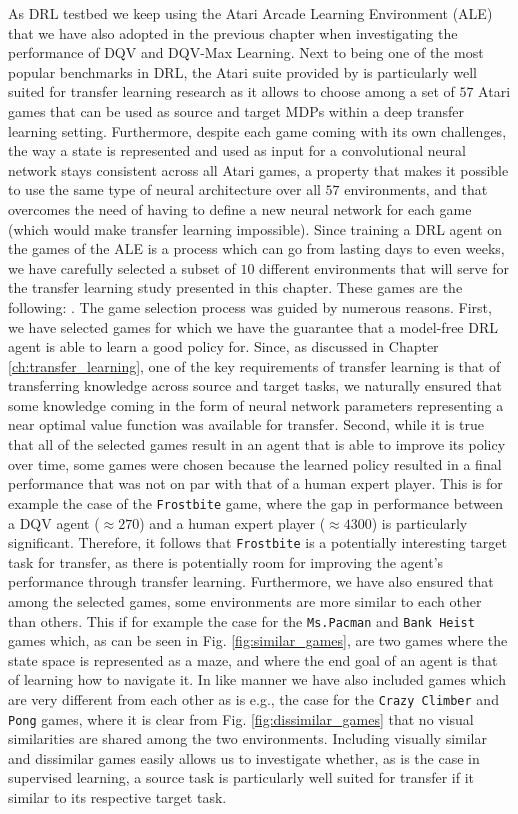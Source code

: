As DRL testbed we keep using the Atari Arcade Learning Environment (ALE) that we have also adopted in the previous chapter when investigating the performance of DQV and DQV-Max Learning. Next to being one of the most popular benchmarks in DRL, the Atari suite provided by \citet{bellemare2013arcade} is particularly well suited for transfer learning research as it allows to choose among a set of $57$ Atari games that can be used as source and target MDPs within a deep transfer learning setting. Furthermore, despite each game coming with its own challenges, the way a state is represented and used as input for a convolutional neural network stays consistent across all Atari games, a property that makes it possible to use the same type of neural architecture over all $57$ environments, and that overcomes the need of having to define a new neural network for each game (which would make transfer learning impossible). Since training a DRL agent on the games of the ALE is a process which can go from lasting days to even weeks, we have carefully selected a subset of $10$ different environments that will serve for the transfer learning study presented in this chapter. These games are the following: . The game selection process was guided by numerous reasons. First, we have selected games for which we have the guarantee that a model-free DRL agent is able to learn a good policy for. Since, as discussed in Chapter \ref{ch:transfer_learning}, one of the key requirements of transfer learning is that of transferring knowledge across source and target tasks, we naturally ensured that some knowledge coming in the form of neural network parameters representing a near optimal value function was available for transfer. Second, while it is true that all of the selected games result in an agent that is able to improve its policy over time, some games were chosen because the learned policy resulted in a final performance that was not on par with that of a human expert player. This is for example the case of the \texttt{Frostbite} game, where the gap in performance between a DQV agent ($\approx 270$) and a human expert player ($\approx 4300$) is particularly significant. Therefore, it follows that \texttt{Frostbite} is a potentially interesting target task for transfer, as there is potentially room for improving the agent's performance through transfer learning. Furthermore, we have also ensured that among the selected games, some environments are more similar to each other than others. This if for example the case for the \texttt{Ms.Pacman} and \texttt{Bank Heist} games which, as can be seen in Fig. \ref{fig:similar_games}, are two games where the state space is represented as a maze, and where the end goal of an agent is that of learning how to navigate it. In like manner we have also included games which are very different from each other as is e.g., the case for the \texttt{Crazy Climber} and \texttt{Pong} games, where it is clear from Fig. \ref{fig:dissimilar_games} that no visual similarities are shared among the two environments. Including visually similar and dissimilar games easily allows us to investigate whether, as is the case in supervised learning, a source task is particularly well suited for transfer if it similar to its respective target task. 

